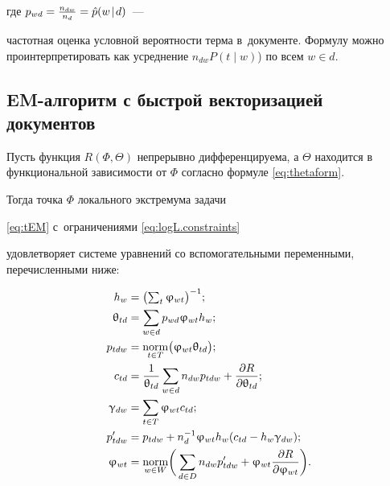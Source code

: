 где $p_{wd} = \frac{n_{dw}}{n_d} = \hat p(w\mspace{2mu}{|}\mspace{2mu} d)$~--- 

частотная оценка условной вероятности терма в~документе. Формулу можно проинтерпретировать как усреднение $n_{dw} P(t \mid w)$) по всем $w \in d$. 

 

\subsection{EM-алгоритм с быстрой векторизацией документов} 

\begin{Theorem} 

\label{th:TARTM} 

    Пусть функция $R(\Phi,\Theta)$ непрерывно дифференцируема, а $\Theta$ находится в функциональной зависимости от $\Phi$ согласно формуле \ref{eq:thetaform}. 

    Тогда точка $\Phi$ локального экстремума задачи 

    \eqref{eq:tEM} с~ограничениями \eqref{eq:logL.constraints} 

    удовлетворяет системе уравнений со вспомогательными переменными, перечисленными ниже: 

 

\begin{align*} 

    h_w         &= \bigl( \textstyle\sum_t \phi_{wt} \bigr)^{-1}; \\ 

    \theta_{td} &= \sum_{w\in d} p_{wd} \phi_{wt} h_w; \\ 

    p_{tdw}     &= \norm_{t\in T} \bigl(\phi_{wt}\theta_{td} \bigr); \\ 

    c_{td}      &= \frac1{\theta_{td}}\sum_{w\in d} n_{dw}p_{tdw} + \frac{\partial R}{\partial \theta_{td}}; \\ 

    \gamma_{dw} &= \sum_{t\in T} \phi_{wt} c_{td}; \\ 

    p'_{tdw}    &= p_{tdw} + n_d^{-1} \phi_{wt}h_w (c_{td}-h_w\gamma_{dw}); 

\\ 

    \phi_{wt} &= \norm_{w\in W} 

        \biggl(\, 

        \sum_{d\in D} n_{dw} p'_{tdw} 

        + \phi_{wt} \frac{\partial{R}}{\partial{\phi_{wt}}} 

        \biggr). 

\end{align*} 

 

\end{Theorem} 

